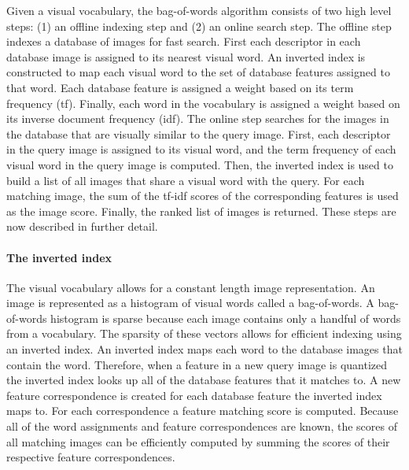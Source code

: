         Given a visual vocabulary, the bag-of-words algorithm consists of two high level steps: (1) an offline indexing
        step and (2) an online search step. The offline step indexes a database of images for fast search. First each
        descriptor in each database image is assigned to its nearest visual word. An inverted index is constructed to
        map each visual word to the set of database features assigned to that word. Each database feature is assigned a
        weight based on its term frequency (tf). Finally, each word in the vocabulary is assigned a weight based on its
        inverse document frequency (idf). The online step searches for the images in the database that are visually
        similar to the query image. First, each descriptor in the query image is assigned to its visual word, and the
        term frequency of each visual word in the query image is computed. Then, the inverted index is used to build a
        list of all images that share a visual word with the query. For each matching image, the sum of the tf-idf
        scores of the corresponding features is used as the image score. Finally, the ranked list of images is returned.
        These steps are now described in further detail.


        \paragraph{The inverted index}
            The visual vocabulary allows for a constant length image representation. An image is represented as a
            histogram of visual words called a bag-of-words. A bag-of-words histogram is sparse because each image
            contains only a handful of words from a vocabulary. The sparsity of these vectors allows for efficient
            indexing using an inverted index. An inverted index maps each word to the database images that contain the
            word. Therefore, when a feature in a new query image is quantized the inverted index looks up all of the
            database features that it matches to. A new feature correspondence is created for each database feature the
            inverted index maps to. For each correspondence a feature matching score is computed. Because all of the
            word assignments and feature correspondences are known, the scores of all matching images can be efficiently
            computed by summing the scores of their respective feature correspondences.

